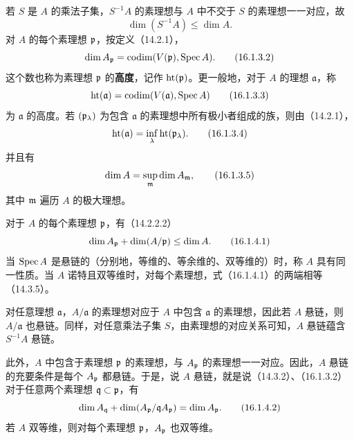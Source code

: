 若 $S$ 是 $A$ 的乘法子集，$S^{-1}A$ 的素理想与 $A$ 中不交于 $S$ 的素理想一一对应，故
\begin{equation}
 \dim(S^{-1}A)\leq\dim A.
 \tag{16.1.3.1}
\end{equation}
对 $A$ 的每个素理想 $\mathfrak p$，按定义（14.2.1），
\begin{equation}
 \dim A_{\mathfrak p}=\operatorname{codim}(V(\mathfrak p),\operatorname{Spec} A).
 \tag{16.1.3.2}
\end{equation}
这个数也称为素理想 $\mathfrak p$ 的\textbf{高度}，记作 $\operatorname{ht}(\mathfrak p)$。更一般地，对于 $A$ 的理想 $\mathfrak a$，称
\begin{equation}
 \operatorname{ht}(\mathfrak a)=\operatorname{codim}(V(\mathfrak a),\operatorname{Spec} A)
 \tag{16.1.3.3}
\end{equation}
为 $\mathfrak a$ 的高度。若 $(\mathfrak p_\lambda)$ 为包含 $\mathfrak a$ 的素理想中所有极小者组成的族，则由（14.2.1），
\begin{equation}
 \operatorname{ht}(\mathfrak a)=\inf_\lambda\operatorname{ht}(\mathfrak p_\lambda).
 \tag{16.1.3.4}
\end{equation}
并且有
\begin{equation}
 \dim A=\sup_{\mathfrak m}\dim A_{\mathfrak m},
 \tag{16.1.3.5}
\end{equation}
其中 $\mathfrak m$ 遍历 $A$ 的极大理想。

对于 $A$ 的每个素理想 $\mathfrak p$，有（14.2.2.2）
\begin{equation}
 \dim A_{\mathfrak p}+\dim(A/\mathfrak p)\leq\dim A.
 \tag{16.1.4.1}
\end{equation}
当 $\operatorname{Spec} A$ 是悬链的（分别地，等维的、等余维的、双等维的）时，称 $A$ 具有同一性质。当 $A$ 诺特且双等维时，对每个素理想，式（16.1.4.1）的两端相等（14.3.5）。

对任意理想 $\mathfrak a$，$A/\mathfrak a$ 的素理想对应于 $A$ 中包含 $\mathfrak a$ 的素理想，因此若 $A$ 悬链，则 $A/\mathfrak a$ 也悬链。同样，对任意乘法子集 $S$，由素理想的对应关系可知，$A$ 悬链蕴含 $S^{-1}A$ 悬链。

此外，$A$ 中包含于素理想 $\mathfrak p$ 的素理想，与 $A_{\mathfrak p}$ 的素理想一一对应。因此，$A$ 悬链的充要条件是每个 $A_{\mathfrak p}$ 都悬链。于是，说 $A$ 悬链，就是说（14.3.2）、（16.1.3.2）对于任意两个素理想 $\mathfrak q\subset\mathfrak p$，有
\begin{equation}
 \dim A_{\mathfrak q}+\dim(A_{\mathfrak p}/\mathfrak q A_{\mathfrak p})=\dim A_{\mathfrak p}.
 \tag{16.1.4.2}
\end{equation}
若 $A$ 双等维，则对每个素理想 $\mathfrak p$，$A_{\mathfrak p}$ 也双等维。

